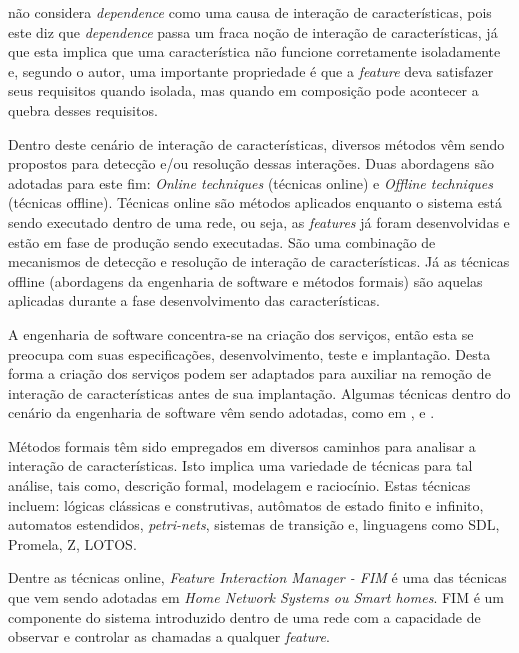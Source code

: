 \cite{NHLABATSI:2008} não considera \textit{dependence} como uma causa de interação de características, pois este diz que \textit{dependence} passa um fraca noção de interação de características, já que esta implica que uma característica não funcione corretamente isoladamente e, segundo o autor, uma importante propriedade é que a \textit{feature} deva satisfazer seus requisitos quando isolada, mas quando em composição pode acontecer a quebra desses requisitos.

Dentro deste cenário de interação de características, diversos métodos vêm sendo propostos para detecção e/ou resolução dessas interações. Duas abordagens são adotadas para este fim: \textit{Online techniques} (técnicas online) e \textit{Offline techniques} (técnicas offline). Técnicas online são métodos aplicados enquanto o sistema está sendo executado dentro de uma rede, ou seja, as \textit{features} já foram desenvolvidas e estão em fase de produção sendo executadas. São uma combinação de mecanismos de detecção e resolução de interação de características. Já as técnicas offline (abordagens da engenharia de software e métodos formais) são aquelas aplicadas durante a fase desenvolvimento das características.\cite{Calder:2003}

A engenharia de software concentra-se na criação dos serviços, então esta se preocupa com suas especificações, desenvolvimento, teste e implantação. Desta forma a criação dos serviços podem ser adaptados para auxiliar na remoção de interação de características antes de sua implantação\cite{Calder:2003}. Algumas técnicas dentro do cenário da engenharia de software vêm sendo adotadas, como em \cite{Thum:2014}, \cite{Siegmund:2012} e \cite{Siegmund2012}.

Métodos formais\cite{Almeida:2011} têm sido empregados em diversos caminhos para analisar a interação de características. Isto implica uma variedade de técnicas para tal análise, tais como, descrição formal, modelagem e raciocínio. Estas técnicas incluem: lógicas clássicas e construtivas, autômatos de estado finito e infinito, automatos estendidos, \textit{petri-nets}, sistemas de transição e, linguagens como SDL, Promela, Z, LOTOS.\cite{Calder:2003}

Dentre as técnicas online, \textit{Feature Interaction Manager - FIM} é uma das técnicas que vem sendo adotadas em \textit{Home Network Systems ou Smart homes}\cite{Wilson:2005}\cite{Wilson:2008}\cite{Nakamura:2009}. FIM\cite{Calder:2003} é um componente do sistema introduzido dentro de uma rede com a capacidade de observar e controlar as chamadas a qualquer \textit{feature}.

